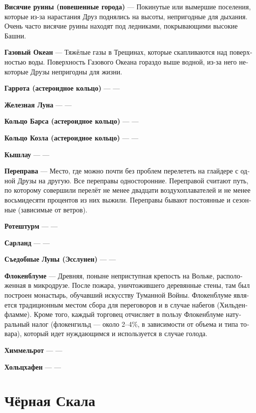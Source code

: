 \documentclass[a4paper,12pt,fleqn]{book}\usepackage{polyglossia}\setdefaultlanguage[babelshorthands=true]{russian}\setotherlanguage{english}\defaultfontfeatures{Ligatures=TeX,Mapping=tex-text}\usepackage{xcolor}\newcommand{\ml}[3]{#2}
\newcommand{\asterism}{\vspace{1em}{\centering\Large\bfseries$\ast~\ast~\ast$\par}\vspace{1em}}
\newcommand{\theterm}[3]{\textbf{\hypertarget{#1}{#2}} --- #3}
\begin{document}
\asterism

\theterm{townhenge}
{Висячие руины (повешенные города)}
{Покинутые или вымершие поселения, которые из-за нарастания Друз поднялись на высоты, непригодные для дыхания.
Очень часто висячие руины находят под ледниками, покрывающими высокие Башни.}

\theterm{gas-ocean}
{Газовый Океан}
{Тяжёлые газы в Трещинах, которые скапливаются над поверхностью воды.
Поверхность Газового Океана гораздо выше водной, из-за него некоторые Друзы непригодны для жизни.}

\theterm{garrota}
{Гаррота (астероидное кольцо)}
{---}

\theterm{eisenloon}
{Железная Луна}
{---}

\theterm{ounce-ring}
{Кольцо Барса (астероидное кольцо)}
{---}

\theterm{goat-ring}
{Кольцо Козла (астероидное кольцо)}
{---}

\theterm{qyschlau}
{Кышлау}
{---}

\theterm{crossing}
{Переправа}
{Место, где можно почти без проблем перелететь на глайдере с одной Друзы на другую.
Все переправы односторонние.
Переправой считают путь, по которому совершили перелёт не менее двадцати воздухоплавателей и не менее восьмидесяти процентов из них выжили.
Переправы бывают постоянные и сезонные (зависимые от ветров).}

\theterm{rotesturm}
{Ротештурм}
{---}

\theterm{sarland}
{Сарланд}
{---}

\theterm{essloonen}
{Съедобные Луны (Эсслунен)}{---}

\theterm{flockenblume}
{Флокенблуме}
{Древняя, поныне неприступная крепость на Вольке, расположенная в микродрузе. После пожара, уничтожившего деревянные стены, там был построен монастырь, обучавший искусству Туманной Войны. Флокенблуме является традиционным местом сбора для переговоров и в случае набегов (Хильденфламме). Кроме того, каждый торговец отчисляет в пользу Флокенблуме натуральный налог (флокенгильд --- около 2--4\%, в зависимости от объема и типа товара), который идет нуждающимся и используется в случае голода.}

\theterm{himmelrot}
{Химмельрот}
{---}

\theterm{holzhafen}
{Хольцхафен}
{---}

\section{Чёрная Скала}
\end{document}

